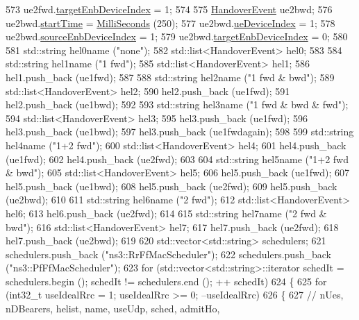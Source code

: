 \begin{DoxyCode}
573   ue2fwd.\hyperlink{structHandoverEvent_a2c869bb0b63b95b0285d3dfca98f81e7}{targetEnbDeviceIndex} = 1;
574 
575   \hyperlink{structHandoverEvent}{HandoverEvent} ue2bwd;
576   ue2bwd.\hyperlink{structHandoverEvent_a0cf5dcaff09d2d881047c40733d3005f}{startTime} = \hyperlink{group__timecivil_gaf26127cf4571146b83a92ee18679c7a9}{MilliSeconds} (250); 
577   ue2bwd.\hyperlink{structHandoverEvent_a0a353020e6276c4e900aa767354e3963}{ueDeviceIndex} = 1;
578   ue2bwd.\hyperlink{structHandoverEvent_a8b235fe78d5b2d534b1e32b7d4d2b0f4}{sourceEnbDeviceIndex} = 1;
579   ue2bwd.\hyperlink{structHandoverEvent_a2c869bb0b63b95b0285d3dfca98f81e7}{targetEnbDeviceIndex} = 0;
580 
581   std::string hel0name (\textcolor{stringliteral}{"none"});
582   std::list<HandoverEvent> hel0;
583 
584   std::string hel1name (\textcolor{stringliteral}{"1 fwd"});
585   std::list<HandoverEvent> hel1;
586   hel1.push\_back (ue1fwd);
587 
588   std::string hel2name (\textcolor{stringliteral}{"1 fwd & bwd"});
589   std::list<HandoverEvent> hel2;
590   hel2.push\_back (ue1fwd);
591   hel2.push\_back (ue1bwd);
592 
593   std::string hel3name (\textcolor{stringliteral}{"1 fwd & bwd & fwd"});
594   std::list<HandoverEvent> hel3;
595   hel3.push\_back (ue1fwd);
596   hel3.push\_back (ue1bwd);
597   hel3.push\_back (ue1fwdagain);
598 
599   std::string hel4name (\textcolor{stringliteral}{"1+2 fwd"});
600   std::list<HandoverEvent> hel4;
601   hel4.push\_back (ue1fwd);
602   hel4.push\_back (ue2fwd);
603 
604   std::string hel5name (\textcolor{stringliteral}{"1+2 fwd & bwd"});
605   std::list<HandoverEvent> hel5;
606   hel5.push\_back (ue1fwd);
607   hel5.push\_back (ue1bwd);
608   hel5.push\_back (ue2fwd);
609   hel5.push\_back (ue2bwd);
610 
611   std::string hel6name (\textcolor{stringliteral}{"2 fwd"});
612   std::list<HandoverEvent> hel6;
613   hel6.push\_back (ue2fwd);
614 
615   std::string hel7name (\textcolor{stringliteral}{"2 fwd & bwd"});
616   std::list<HandoverEvent> hel7;
617   hel7.push\_back (ue2fwd);
618   hel7.push\_back (ue2bwd);
619 
620   std::vector<std::string> schedulers;
621   schedulers.push\_back (\textcolor{stringliteral}{"ns3::RrFfMacScheduler"});
622   schedulers.push\_back (\textcolor{stringliteral}{"ns3::PfFfMacScheduler"});
623   \textcolor{keywordflow}{for} (std::vector<std::string>::iterator schedIt = schedulers.begin (); schedIt != schedulers.end (); ++
      schedIt)
624     \{
625       \textcolor{keywordflow}{for} (int32\_t useIdealRrc = 1; useIdealRrc >= 0; --useIdealRrc)
626         \{
627           \textcolor{comment}{//                                     nUes, nDBearers, helist, name, useUdp, sched, admitHo,
}
\end{DoxyCode}
